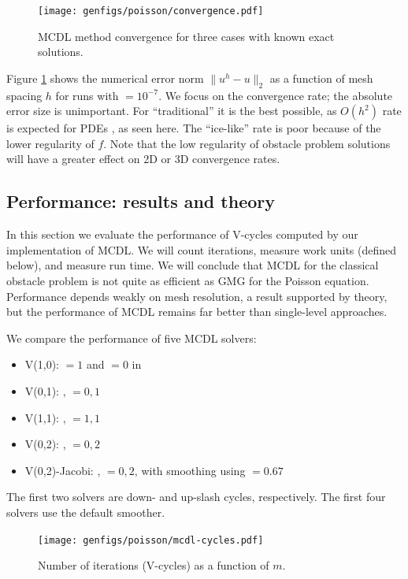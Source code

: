 \documentclass[letterpaper,final,12pt,reqno]{amsart}
\theoremstyle{claim}
\numberwithin{equation}{section}
\numberwithin{figure}{section}
\numberwithin{table}{section}
\numberwithin{theorem}{section}
\begin{document}
\begin{figure}
\texttt{[image: genfigs/poisson/convergence.pdf]}
\caption{MCDL method convergence for three cases with known exact solutions.}
\label{fig:convergence}
\end{figure}

Figure \ref{fig:convergence} shows the numerical error norm $\|u^h-u\|_2$ as a function of mesh spacing $h$ for runs with  $=10^{-7}$.  We focus on the convergence rate; the absolute error size is unimportant.  For ``traditional'' it is the best possible, as $O(h^2)$ rate is expected for PDEs \cite{Elmanetal2014}, as seen here.  The ``ice-like'' rate is poor because of the lower regularity of $f$.  Note that the low regularity of obstacle problem solutions will have a greater effect on 2D or 3D convergence rates.

\subsection{Performance: results and theory} \label{subsec:obstacleperformance}  In this section we evaluate the performance of V-cycles computed by our implementation of MCDL.  We will count iterations, measure work units (defined below), and measure run time.  We will conclude that MCDL for the classical obstacle problem is not quite as efficient as GMG for the Poisson equation.  Performance depends weakly on mesh resolution, a result supported by theory, but the performance of MCDL remains far better than single-level approaches.

We compare the performance of five MCDL solvers:
\begin{itemize}
\item \textsf{V(1,0)}:  $=1$ and  $=0$ in 
\item \textsf{V(0,1)}: ,  $=0,1$
\item \textsf{V(1,1)}: ,  $=1,1$
\item \textsf{V(0,2)}: ,  $=0,2$
\item \textsf{V(0,2)-Jacobi}: ,  $=0,2$, with  smoothing using  $=0.67$
\end{itemize}
The first two solvers are down- and up-slash cycles, respectively.  The first four solvers use the default  smoother.

\begin{figure}
\texttt{[image: genfigs/poisson/mcdl-cycles.pdf]}
\caption{Number of iterations (V-cycles) as a function of $m$.}
\label{fig:mcdl-cycles}
\end{figure}
\end{document}
